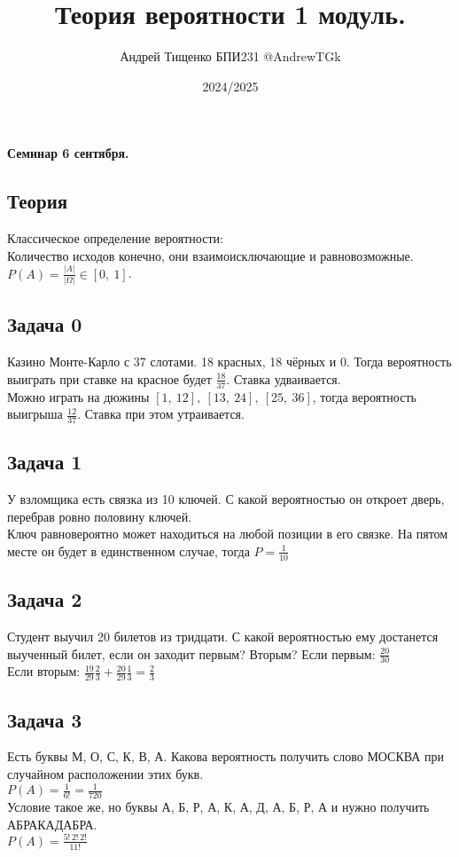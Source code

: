 \documentclass[12pt, a4paper]{article}
\title{Теория вероятности 1 модуль.}
\author{Андрей Тищенко БПИ231 @AndrewTGk}
\date{2024/2025}
\begin{document}
    \maketitle
    \begin{center}
        \textbf{Семинар 6 сентября.}
    \end{center}
    \subsection*{Теория}
    Классическое определение вероятности:\\
    Количество исходов конечно, они взаимоисключающие и равновозможные.\\
    $P(A) = \frac{|A|}{|\Omega|}\in [0,\ 1]$.
    \subsection*{Задача 0}
    Казино Монте-Карло с 37 слотами. 18 красных, 18 чёрных и 0. Тогда вероятность 
    выиграть при ставке на красное будет $\frac{18}{37}$. Ставка удваивается.\\
    Можно играть на дюжины $[1,\ 12],\ [13,\ 24],\ [25,\ 36]$, тогда вероятность 
    выигрыша $\frac{12}{37}$. Ставка при этом утраивается.
    \subsection*{Задача 1}
    У взломщика есть связка из 10 ключей. С какой вероятностью он откроет дверь, 
    перебрав ровно половину ключей.\\
    Ключ равновероятно может находиться на любой позиции в его связке. На пятом месте он 
    будет в единственном случае, тогда $P = \frac{1}{10}$
    \subsection*{Задача 2}
    Студент выучил 20 билетов из тридцати. С какой вероятностью 
    ему достанется выученный билет, если он заходит первым? Вторым?
    Если первым: $\frac{20}{30}$\\
    Если вторым: $\frac{19}{29}\frac{2}{3} + \frac{20}{29}\frac{1}{3} = \frac{2}{3}$
    \subsection*{Задача 3}
    Есть буквы М, О, С, К, В, А. Какова вероятность получить 
    слово МОСКВА при случайном расположении этих букв.\\
    $P(A) = \frac{1}{6!} = \frac{1}{720}$\\
    Условие такое же, но буквы А, Б, Р, А, К, А, Д, А, Б, Р, А и нужно получить АБРАКАДАБРА.\\
    $P(A) = \frac{5!\,2!\,2!}{11!}$
\end{document}
